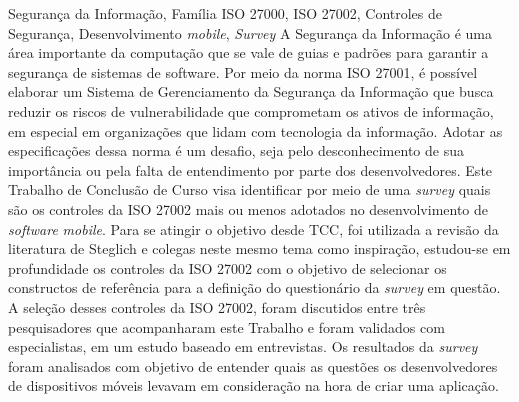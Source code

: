 \documentclass[portuguese,oneside]{tcc}
\begin{document}
\begin{resumo}{Segurança da Informação, Família ISO 27000, ISO 27002, Controles de Segurança, Desenvolvimento \textit{mobile}, \textit{Survey}}
 \vspace{-0.5cm}
 A Segurança da Informação é uma área importante da computação que se vale de guias e padrões para garantir a segurança de sistemas de software. Por meio da norma ISO 27001, é possível elaborar um Sistema de Gerenciamento da Segurança da Informação que busca reduzir os riscos de vulnerabilidade que comprometam os ativos de informação, em especial em organizações que lidam com tecnologia da informação. Adotar as especificações dessa norma é um desafio, seja pelo desconhecimento de sua importância ou pela falta de entendimento por parte dos desenvolvedores. Este Trabalho de Conclusão de Curso visa identificar por meio de uma \textit{survey} quais são os controles da ISO 27002 mais ou menos adotados no desenvolvimento de \textit{software} \textit{mobile}. Para se atingir o objetivo desde TCC, foi utilizada a revisão da literatura de Steglich e colegas \cite{caio2019} neste mesmo tema como inspiração, estudou-se em profundidade os controles da ISO 27002 com o objetivo de selecionar os constructos de referência para a definição do questionário da \textit{survey} em questão.  A seleção desses controles da ISO 27002, foram discutidos entre três pesquisadores que acompanharam este Trabalho e foram validados com especialistas, em um estudo baseado em entrevistas. Os resultados da \textit{survey} foram analisados com objetivo de entender quais as questões os desenvolvedores de dispositivos móveis levavam em consideração na hora de criar uma aplicação.
 

 
 




\end{resumo}
\end{document}
